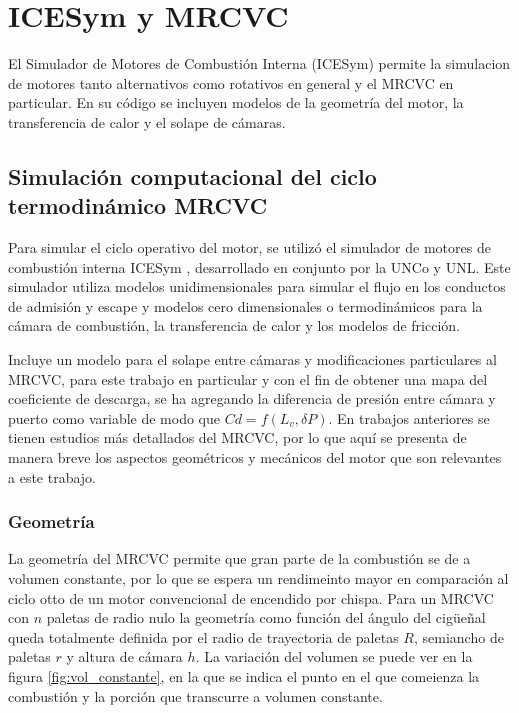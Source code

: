 \chapter{ICESym y MRCVC}

El Simulador de Motores de Combustión Interna (ICESym) permite la simulacion de
motores tanto alternativos como rotativos en general y el MRCVC en particular.
%
En su código se incluyen modelos de la geometría del motor, la transferencia
de calor y el solape de cámaras.

\section{Simulación computacional del ciclo termodinámico MRCVC}

Para simular el ciclo operativo del motor, se utilizó el simulador de motores
de combustión interna ICESym \cite{icesym}, desarrollado en conjunto por la
UNCo y UNL.
%
Este simulador utiliza modelos unidimensionales para simular el flujo en los
conductos de admisión y escape y modelos cero dimensionales o termodinámicos
para la cámara de combustión, la transferencia de calor y los modelos de
fricción.
%

Incluye un modelo para el solape entre cámaras \cite{lopez16} y modificaciones
particulares al MRCVC, para este trabajo en particular  y con el fin de obtener
una mapa del coeficiente de descarga, se ha agregando la diferencia de presión
entre cámara y puerto como variable de modo que $Cd = f(L_v, \delta P)$.
%
En trabajos anteriores se tienen estudios más detallados del MRCVC, por lo que
aquí se presenta de manera breve los aspectos geométricos y mecánicos del motor
que son relevantes a este trabajo.

\subsection{Geometría}
%
La geometría del MRCVC permite que gran parte de la combustión se de a volumen
constante\cite{mrcvc_geom}, por lo que se espera un rendimeinto mayor en
comparación al ciclo otto de un motor convencional de encendido por chispa.
%
Para un MRCVC con $n$ paletas de radio nulo la geometría como función del
ángulo del cigüeñal queda totalmente definida por el radio de trayectoria de
paletas $R$, semiancho de paletas $r$ y altura de cámara $h$.
%
La variación del volumen se puede ver en la figura \ref{fig:vol_constante}, en
la que se indica el punto en el que comeienza la combustión y la porción que
transcurre a volumen constante.

